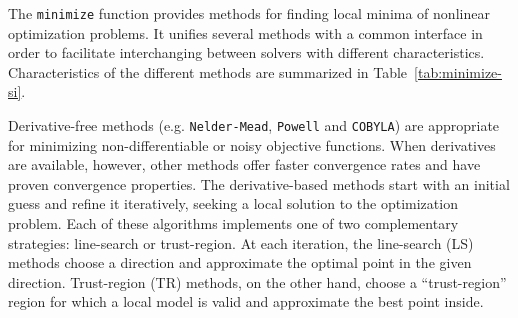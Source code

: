 The \texttt{minimize} function provides methods for finding local minima of
nonlinear optimization problems. It unifies several methods with a common 
interface in order to facilitate interchanging between solvers with different
characteristics. Characteristics of the different methods are summarized in 
Table~\ref{tab:minimize-si}.

Derivative-free methods (e.g. \texttt{Nelder-Mead}, \texttt{Powell} and \texttt{COBYLA}) are appropriate for minimizing non-differentiable or
noisy objective functions. When derivatives are available, however, other methods offer faster convergence rates
and have proven convergence properties. 
The derivative-based methods start with an initial guess and refine it iteratively, seeking
a local solution to the optimization problem. Each of these algorithms implements one of two complementary strategies:
line-search or trust-region. At each iteration, the line-search (LS) methods choose a direction
and approximate the optimal point in the given direction. Trust-region (TR) methods, on the other
hand, choose a ``trust-region'' region for which a local model is valid and approximate the best point
inside.


